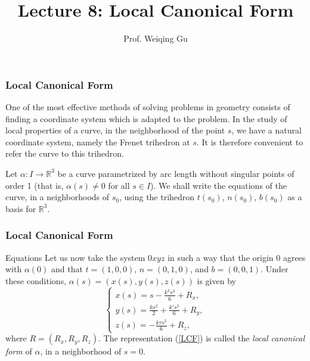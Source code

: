 \documentclass[handout]{beamer}
\title{Lecture 8: Local Canonical Form}
\author{Prof. Weiqing Gu}
\date{}
\institute{Math 142:\\Differential Geometry}
\theoremstyle{definition}
\theoremstyle{remark}
\newcommand{\R}{\mathbb{R}}
\newcommand{\ds}{\displaystyle}
\renewcommand{\=}{&=&}
\newcommand{\<}{\langle}
\renewcommand{\>}{\rangle}
\begin{document}
\small

\begin{frame}
\titlepage
\end{frame}

\begin{frame}[t]
\frametitle{Local Canonical Form}
\begin{block}{}
One of the most effective methods of solving problems in geometry consists of finding a coordinate
system which is adapted to the problem. In the study of local properties of a curve, in the
neighborhood of the point $s$, we have a natural coordinate system, namely the Frenet
trihedron at $s$. It is therefore convenient to refer the curve to this trihedron.
\end{block}
\begin{block}{}
Let $\alpha : I \to \R^3$ be a curve parametrized by arc length without singular points of order 1
(that is, $\alpha(s) \ne 0$ for all $s \in I$). We shall write the equations of the curve, in a
neighborhoods of $s_0$, using the trihedron $t(s_0)$, $n(s_0)$, $b(s_0)$ as a basis for $\R^3$.
\end{block}
\end{frame}

\begin{frame}[t]
\frametitle{Local Canonical Form}
\begin{block}{Equations}
Let us now take the system $0xyz$ in such a way that the origin 0 agrees with $\alpha(0)$ and
that $t = (1,0,0)$, $n = (0,1,0)$, and $b = (0,0,1)$. Under these conditions, $\alpha(s) = (x(s),y(s),
z(s))$ is given by
\begin{equation}
\label{LCF}
\begin{cases}
\ds x(s) = s - \frac{k^2 s^3}{6} + R_x, \\[5pt]
\ds y(s) = \frac{k s^2}{2} + \frac{k' s^3}{6} + R_y, \\[5pt]
\ds z(s) = -\frac{k \tau s^3}{6} + R_z,
\end{cases}
\end{equation}
where $R = (R_x, R_y, R_z)$. The representation (\ref{LCF}) is called the \emph{local canonical
form} of $\alpha$, in a neighborhood of $s = 0$.
\end{block}
\end{frame}
\end{document}
